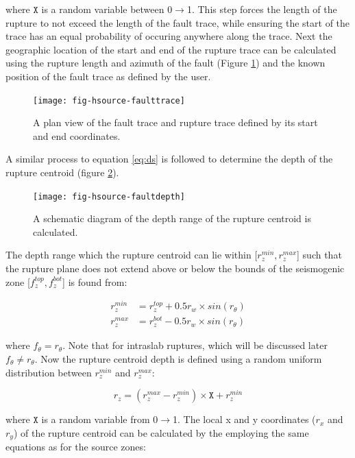 where $\mathtt{X}$ is a random variable between 0$\rightarrow$1. This step forces the length of the rupture to not exceed the length of the fault trace, while 
ensuring the start of the trace has an equal probability of occuring anywhere along the trace. Next the geographic location of the start and end of the rupture trace can be 
calculated using the rupture length and azimuth of the fault (Figure \ref{fig:traces}) and the known position of the fault trace as defined by the user. 

\begin{figure}[htp]
\centerline{\texttt{[image: fig-hsource-faulttrace]}}
\caption{A plan view of the fault trace and rupture trace defined by its start and end coordinates.}
\label{fig:traces}
\end{figure}

A similar process to equation \ref{eq:ds} is followed to determine the depth of the rupture centroid (figure \ref{fig:rzrange}). 

\begin{figure}[htp]
\centerline{\texttt{[image: fig-hsource-faultdepth]}}
\caption{A schematic diagram of the depth range of the rupture centroid is calculated.}
\label{fig:rzrange}
\end{figure}

The depth range which the rupture centroid can lie within [$r_z^{min}, r_z^{max}$] such that 
the rupture plane does not extend above or below the bounds of the seismogenic zone [$f_z^{top}, f_z^{bot}$] is found from:

\begin{subequations} \label{drange}
\begin{align}
r_z^{min} & = r_z^{top} + 0.5r_w  \times sin(r_\theta)    \\
r_z^{max} & = r_z^{bot} - 0.5r_w  \times sin(r_\theta)  
\end{align}
\end{subequations}

where $f_\theta = r_\theta$. Note that for intraslab ruptures, which will be discussed later $f_\theta \ne r_\theta$. 
Now the rupture centroid depth is defined using a random uniform distribution between $r_z^{min}$ and $r_z^{max}$:

\begin{equation} \label{eq:rand}
	r_z = ( r_z^{max}-r_z^{min} ) \times  \mathtt{X} +   r_z^{min}
\end{equation}

where $\mathtt{X}$ is a random variable from 0$\rightarrow$1. The local x and y coordinates ($r_x$ and $r_y$) of the rupture 
centroid can be calculated by the employing the same equations as for the source zones:

